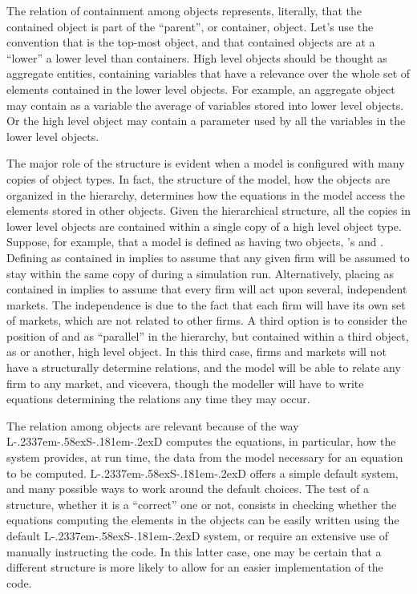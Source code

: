 \documentclass [11pt,a4paper] {book}
\def\LsD{{L\kern-.2337em\lower-.58ex\hbox{S}\kern-.181em\lower-.2ex\hbox{D}}\xspace}
\begin{document}
The relation of containment among objects represents, literally, that the contained object is part of the ``parent'', or container, object. Let's use the convention that  is the top-most object, and that contained objects are at a ``lower'' a lower level than containers. High level objects should be thought as aggregate entities, containing variables that have a relevance over the whole set of elements contained in the lower level objects. For example, an aggregate object may contain as a variable the average of variables stored into lower level objects. Or the high level object may contain a parameter used by all the variables in the lower level objects.

The major role of the structure is evident when a model is configured with many copies of object types. In fact, the structure of the model, how the objects are organized in the hierarchy, determines how the equations in the model access the elements stored in other objects. Given the hierarchical structure, all the copies in lower level objects are contained within a single copy of a high level object type. Suppose, for example, that a model is defined as having two objects, 's and . Defining  as contained in  implies to assume that any given firm will be assumed to stay within the same copy of  during a simulation run. Alternatively, placing  as contained in  implies to assume that every firm will act upon several, independent markets. The independence is due to the fact that each firm will have its own set of markets, which are not related to other firms. A third option is to consider the position of  and  as ``parallel'' in the hierarchy, but contained within a third object, as  or another, high level object. In this third case, firms and markets will not have a structurally determine relations, and the model will be able to relate any firm to any market, and vicevera, though the modeller will have to write equations determining the relations any time they may occur.


The relation among objects are relevant because of the way \LsD computes the equations, in particular, how the system provides, at run time, the data from the model necessary for an equation to be computed. \LsD offers a simple default system, and many possible ways to work around the default choices. The test of a structure, whether it is a ``correct'' one or not, consists in checking whether the equations computing the elements in the objects can be easily written using the default \LsD system, or require an extensive use of manually instructing the code. In this latter case, one may be certain that a different structure is more likely to allow for an easier implementation of the code.
\end{document}
